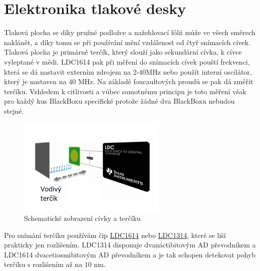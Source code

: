 \section{Elektronika tlakové desky}
\label{E4-tlakovka}
Tlaková plocha se díky pružné podložce a nažehlovací fólii může ve všech směrech naklánět, a díky tomu se při používání mění vzdálenost od čtyř snímacích
cívek. Tlaková plocha je primárně terčík, který slouží jako sekundární cívka, k cívce vyleptané v mědi. LDC1614 pak při měření do snímacích 
cívek pouští frekvenci, která se dá nastavit externím zdrojem na 2-40MHz nebo použít interní oscilátor, který je nastaven na 40 MHz. 
Na základě foucaultových proudů se pak dá změřit  terčíku. 
Vzhledem k citlivosti a vůbec samotnému principu je toto měření však pro každý kus BlackBoxu specifické protože žádné dva BlackBoxu nebudou stejné.

\begin{figure}[h]
    \centering
    \includegraphics[width=200pt]{kapitoly/obrazky/E4/elektronika_tlakove_desky/civka_tercik_LDC.png}
    \caption{Schematické zobrazení cívky a terčíku \parencite{LDC-cd1}}
    \label{fig:E4-sch_civka_tercik}
\end{figure}

Pro snímání terčíku používám čip \href{https://www.ti.com/lit/ds/symlink/ldc1612.pdf?ts=1612018658531&ref_url=https%253A%252F%252Fwww.google.com%252F}{LDC1614} \parencite{LDC1614}
nebo \href{https://www.ti.com/lit/ds/symlink/ldc1312.pdf?ts=1612017390818&ref_url=https%253A%252F%252Fwww.google.com%252F}{LDC1314}, 
které se liší prakticky jen rozlišením. LDC1314 disponuje dvanáctibitovým AD převodníkem a LDC1614 dvacetiosmibitovým AD převodníkem 
a je tak schopen detekovat pohyb terčíku s rozlišením až na 10 nm.

